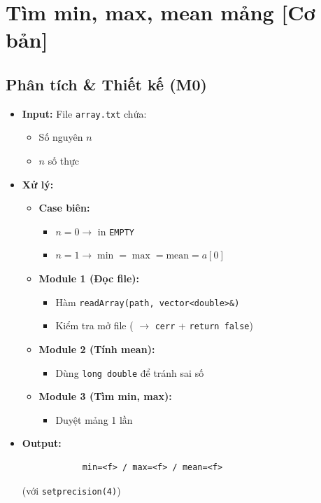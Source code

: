 \section{Tìm min, max, mean mảng [Cơ bản]}
\subsection{Phân tích \& Thiết kế (M0)}
    \begin{itemize}
    \item \textbf{Input:}
    File \texttt{array.txt} chứa:
    \begin{itemize}
        \item Số nguyên $n$
        \item $n$ số thực
    \end{itemize}

    \item \textbf{Xử lý:}
        \begin{itemize}
            \item \textbf{Case biên:}
            \begin{itemize}
                \item $n = 0 \rightarrow$ in \texttt{EMPTY}
                \item $n = 1 \rightarrow \min = \max = \text{mean} = a[0]$
            \end{itemize}
            
            \item \textbf{Module 1 (Đọc file):}
            \begin{itemize}
                \item Hàm \texttt{readArray(path, vector<double>\&)}
                \item Kiểm tra mở file ( $\rightarrow$ \texttt{cerr} + \texttt{return false})
            \end{itemize}
            
            \item \textbf{Module 2 (Tính mean):}
            \begin{itemize}
                \item Dùng \texttt{long double} để tránh sai số
            \end{itemize}
            
            \item \textbf{Module 3 (Tìm min, max):}
            \begin{itemize}
                \item Duyệt mảng 1 lần
            \end{itemize}
        \end{itemize}

        \item \textbf{Output:}
        \begin{lstlisting}
            min=<f> / max=<f> / mean=<f>\end{lstlisting} 
        (với \texttt{setprecision(4)})
    \end{itemize}

